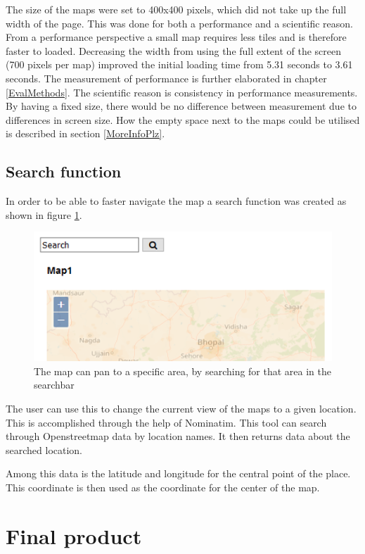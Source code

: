 The size of the maps were set to 400x400 pixels, which did not take up the full width of the page. This was done for both a performance and a scientific reason. From a performance perspective a small map requires less tiles and is therefore faster to loaded. Decreasing the width from using the full extent of the screen (700 pixels per map) improved the initial loading time from 5.31 seconds to 3.61 seconds. The measurement of performance is further elaborated in chapter \ref{EvalMethods}. 
The scientific reason is consistency in performance measurements. By having a fixed size, there would be no difference between measurement due to differences in screen size. How the empty space next to the maps could be utilised is described in section \ref{MoreInfoPlz}.  
 

\subsection{Search function}
In order to be able to faster navigate the map a search function was created as shown in figure \ref{SearchBar}. 

\begin{figure} [H]
	\centering
	\includegraphics[width=.8\textwidth]{Pictures/SearchBar}
	\caption{The map can pan to a specific area, by searching for that area in the searchbar}
	\label{SearchBar}
\end{figure}

The user can use this to change the current view of the maps to a given location. This is accomplished through the help of Nominatim. This tool can search through Openstreetmap data by location names. It then returns data about the searched location. 

Among this data is the latitude and longitude for the central point of the place. \citep{Nominatim}
This coordinate is then used as the coordinate for the center of the map.

\section{Final product}


